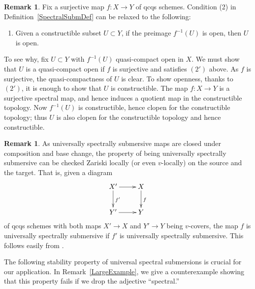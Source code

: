 \documentclass[reqno]{amsart}
\newcommand{\cl}{\colon}
\theoremstyle{definition}
\newtheorem{remark}[theorem]{Remark}
\begin{document}
\begin{remark}
\label{AltDefSpecSubm}
Fix a surjective map $f\colon X \to Y$ of qcqs schemes. Condition (2) in Definition~\ref{SpectralSubmDef} can be relaxed to the following:
\begin{enumerate}
\item[$(2')$] Given a constructible subset $U \subset Y$, if the preimage $f^{-1}(U)$ is open, then $U$ is open. 
\end{enumerate}
To see why, fix $U \subset Y$ with $f^{-1}(U)$ quasi-compact open in $X$. We must
show that $U$ is a quasi-compact open if $f$ is surjective and satisfies $(2')$ above. As $f$ is surjective, the quasi-compactness
of $U$ is clear. To show openness, thanks to $(2')$, it is enough to show that
$U$ is constructible. 
The map $f \cl X \to Y$ is a surjective spectral map, and hence induces a quotient
map in the constructible topology. 
Now $f^{-1}(U)$ is constructible, hence clopen for the constructible topology;
thus $U$ is also clopen for the constructible topology and hence constructible. 
\end{remark}
\begin{remark}
As universally spectrally submersive maps are closed under composition and base
change, the property of being universally spectrally submersive can be checked
Zariski locally (or even $v$-locally) on the source and the target. 
That is, given a diagram
\[ \xymatrix{
X' \ar[d]^{f'} \ar[r] &  X \ar[d]^f  \\
Y' \ar[r] &  Y
}\]
of qcqs schemes with both maps $X' \to X$ and $Y' \to Y$ being $v$-covers, 
the map $f$ is universally spectrally submersive if $f'$ is
universally spectrally submersive. 
This follows easily from . 
\end{remark}



The following stability property of universal spectral submersions is crucial for our application.
In Remark~\ref{LargeExample}, we give a counterexample showing that this
property fails if we drop the adjective ``spectral.''
\end{document}
